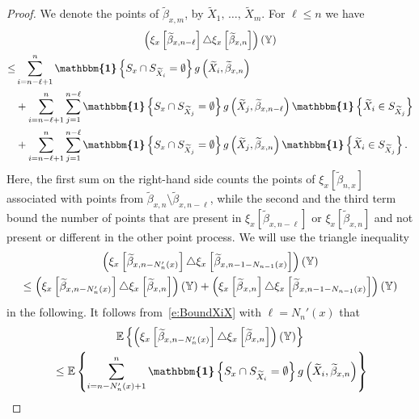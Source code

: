 \documentclass[AHL,Unicode,longabstracts]{cedram}
\newcommand*\Y{\mathbb{Y}}
\newcommand{\E}{\mathbb{E}}
\newcommand{\mean}[1] {\E\left\{{#1}\right\}}
\newcommand{\ind}{\boldsymbol{\mathbbm{1}}}
\let\oldtilde\tilde
\renewcommand*{\tilde}[1]{\mathchoice{\widetilde{#1}}{\widetilde{#1}}{\oldtilde{#1}}{\oldtilde{#1}}}
\begin{document}
\begin{proof}
We denote the points of $\widetilde{\beta}_{x,m}$, by $\widetilde{X}_1,\,\hdots,\,\widetilde{X}_m$. For $\ell\leq n$ we have
\begin{multline}\label{e:BoundXiX}
\left(\xi_x\left[\widetilde{\beta}_{x,n-\ell}\right] \triangle \xi_x\left[\widetilde{\beta}_{x,n}\right]\right)(\Y)\\
\begin{aligned}
\leq& \sum_{i=n-\ell+1}^n \ind\left\{S_x\cap S_{\widetilde{X}_i} = \emptyset\right\} g\left(\widetilde{X}_i,\widetilde{\beta}_{x,n}\right)
\\ 
&+ \sum_{i=n-\ell+1}^n \sum_{j=1}^{n-\ell} \ind\left\{S_x \cap S_{\widetilde{X}_j} = \emptyset \right\} g\left(\widetilde{X}_j,\widetilde{\beta}_{x,n-\ell}\right) \ind\left\{\widetilde{X}_i \in S_{\widetilde{X}_j}\right\} \\
& + \sum_{i=n-\ell+1}^n \sum_{j=1}^{n-\ell} \ind
\left\{S_x \cap S_{\widetilde{X}_j} = \emptyset \right\} g\left(\widetilde{X}_j,\widetilde{\beta}_{x,n}\right) \ind\left\{\widetilde{X}_i\in S_{\widetilde{X}_j} \right\}.
\end{aligned}
\end{multline}
Here, the first sum on the right-hand side counts the points of $\xi_x[\widetilde{\beta}_{n,x}]$ associated with points from $\widetilde{\beta}_{x,n}\setminus\widetilde{\beta}_{x,n-\ell}$, while the second and the third term bound the number of points that are present in $\xi_x[\widetilde{\beta}_{x,n-\ell}]$ or $\xi_x[\widetilde{\beta}_{x,n}]$ and not present or different in the other point process. We will use the triangle inequality
\begin{multline*}
\left(\xi_x\left[\widetilde{\beta}_{x,n-N_{n}'(x)}\right] \triangle \xi_x\left[\widetilde{\beta}_{x,n-1-N_{n-1}(x)}\right]\right)(\Y) \\
\leq \left(\xi_x\left[\widetilde{\beta}_{x,n-N_n'(x)}\right] \triangle \xi_x\left[\widetilde{\beta}_{x,n}\right]\right)(\Y) + \left(\xi_x\left[\tilde{\beta}_{x,n}\right] \triangle \xi_x\left[\tilde{\beta}_{x,n-1-N_{n-1}(x)}\right]\right)(\Y)
\end{multline*}
in the following. It follows from~\eqref{e:BoundXiX} with $\ell=N_n'(x)$ that
\begin{multline*}
\mean{\left(\xi_x\left[\widetilde{\beta}_{x,n-N_n'(x)}\right] \triangle \xi_x\left[\widetilde{\beta}_{x,n}\right]\right)(\Y)}\\
\begin{aligned}
& \leq \mean{\sum_{i=n-N_n'(x)+1}^n \ind\left\{S_x \cap S_{\widetilde{X}_i} = \emptyset\right\} g\left(\widetilde{X}_i,\widetilde{\beta}_{x,n}\right)} \\

\end{aligned}
\end{multline*}
\end{proof}
\end{document}
